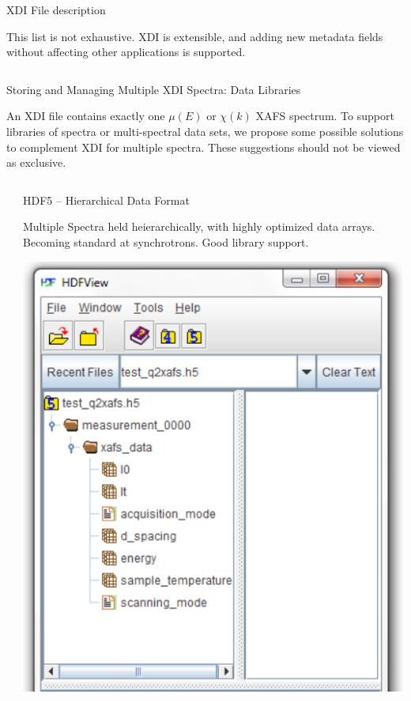 \documentclass[final]{beamer}
\begin{document}
\begin{frame}{}
\begin{columns}[t]
\begin{column}{.42\linewidth}
\begin{block}{\large XDI File description}
         \hspace{3mm}

         This list is not exhaustive.  XDI is extensible, and adding new
         metadata fields without affecting other applications is supported.


       \end{block}
     \end{column}
   \end{columns}

   \begin{block}{\large Storing and Managing Multiple XDI Spectra:  Data Libraries}

     An XDI file contains exactly one $\mu(E)$ or $\chi(k)$ XAFS
     spectrum.  To support libraries of spectra or multi-spectral data
     sets, we propose some possible solutions to complement XDI for multiple spectra.
     These suggestions should not be viewed as exclusive.

   \end{block}

  \vspace{-1mm}

    \begin{columns}[t]
      \begin{column}{.01\linewidth}
      \end{column}
      \begin{column}{.31\linewidth}
        \begin{block}{HDF5 -- Hierarchical Data Format}

          \justifying Multiple Spectra held heierarchically, with highly
          optimized data arrays.  Becoming standard at synchrotrons.  Good
          library support.

         \vspace{9mm}

         \begin{center}
           \includegraphics[width=0.6\linewidth]{hdf5.png}
         \end{center}


\end{block}
\end{column}
\end{columns}
\end{frame}
\end{document}
